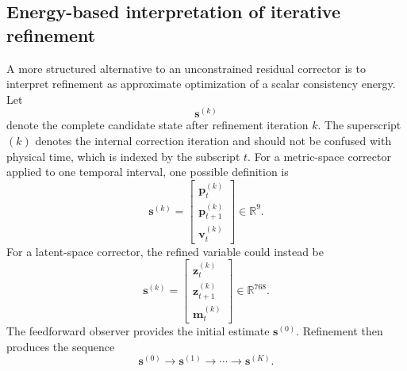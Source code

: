 \documentclass[11pt,a4paper]{article}
\begin{document}
\subsection{Energy-based interpretation of iterative refinement} \label{sec:energy-refinement} 
A more structured alternative to an unconstrained residual corrector is to interpret refinement as approximate optimization of a scalar consistency energy. Let 
\begin{equation} 
	\mathbf s^{(k)} 
\end{equation} 
denote the complete candidate state after refinement iteration $k$. The superscript $(k)$ denotes the internal correction iteration and should not be confused with physical time, which is indexed by the subscript $t$. For a metric-space corrector applied to one temporal interval, one possible definition is 
\begin{equation} 
	\mathbf s^{(k)} = \begin{bmatrix} \mathbf p_t^{(k)} \\ \mathbf p_{t+1}^{(k)} \\ \mathbf v_t^{(k)} \end{bmatrix} \in \mathbb{R}^{9}. \label{eq:metric-refinement-state} 
\end{equation} For a latent-space corrector, the refined variable could instead be 
\begin{equation} 
	\mathbf s^{(k)} = \begin{bmatrix} \mathbf z_t^{(k)} \\ \mathbf z_{t+1}^{(k)} \\ \mathbf m_t^{(k)} \end{bmatrix} \in \mathbb{R}^{768}. \label{eq:latent-refinement-state} 
\end{equation} 
The feedforward observer provides the initial estimate $\mathbf s^{(0)}$. Refinement then produces the sequence 
\begin{equation} 
	\mathbf s^{(0)} \longrightarrow \mathbf s^{(1)} \longrightarrow \cdots \longrightarrow \mathbf s^{(K)}. 
\end{equation} 
\end{document}
